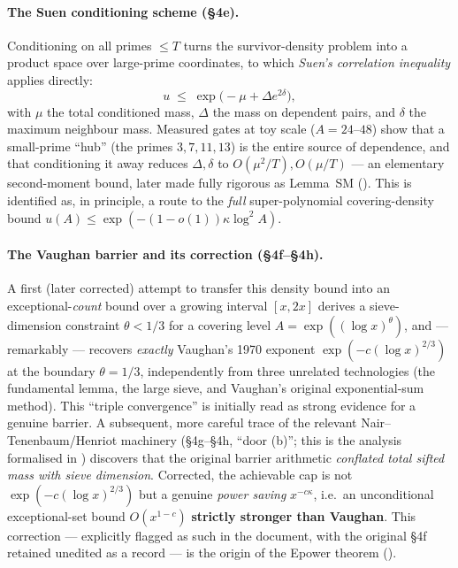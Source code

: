 \documentclass[11pt]{article}
\theoremstyle{plain}
\theoremstyle{definition}
\theoremstyle{remark}
\renewcommand{\_}{\textunderscore\allowbreak}
\begin{document}
\paragraph{The Suen conditioning scheme (\S4e).}
Conditioning on all primes $\le T$ turns the survivor-density problem into a product space over
large-prime coordinates, to which \emph{Suen's correlation inequality} \cite{Suen1990,Janson1990}
applies directly:
\[
u \;\le\; \exp\!\bigl(-\mu+\Delta e^{2\delta}\bigr),
\]
with $\mu$ the total conditioned mass, $\Delta$ the mass on dependent pairs, and $\delta$ the
maximum neighbour mass. Measured gates at toy scale ($A=24$--$48$) show that a small-prime
``hub'' (the primes $3,7,11,13$) is the entire source of dependence, and that conditioning it
away reduces $\Delta,\delta$ to $O(\mu^2/T),O(\mu/T)$ — an elementary second-moment bound, later
made fully rigorous as Lemma~SM (). This is identified as, in principle, a
route to the \emph{full} super-polynomial covering-density bound $u(A)\le\exp(-(1-o(1))\kappa\log^2A)$.

\paragraph{The Vaughan barrier and its correction (\S4f--\S4h).}
A first (later corrected) attempt to transfer this density bound into an exceptional-\emph{count}
bound over a growing interval $[x,2x]$ derives a sieve-dimension constraint
$\theta<1/3$ for a covering level $A=\exp((\log x)^\theta)$, and — remarkably — recovers
\emph{exactly} Vaughan's 1970 exponent $\exp(-c(\log x)^{2/3})$ at the boundary $\theta=1/3$,
independently from three unrelated technologies (the fundamental lemma, the large sieve, and
Vaughan's original exponential-sum method). This ``triple convergence'' is initially read as
strong evidence for a genuine barrier. A subsequent, more careful trace of the relevant Nair--
Tenenbaum/Henriot machinery (\S4g--\S4h, ``door (b)''; this is the analysis formalised in
) discovers that the original barrier arithmetic \emph{conflated total
sifted mass with sieve dimension}. Corrected, the achievable cap is not
$\exp(-c(\log x)^{2/3})$ but a genuine \emph{power saving} $x^{-c\kappa}$, i.e.\ an
unconditional exceptional-set bound $O(x^{1-c})$ \textbf{strictly stronger than Vaughan}. This
correction — explicitly flagged as such in the document, with the original \S4f retained
unedited as a record — is the origin of the E\_power theorem ().
\end{document}
